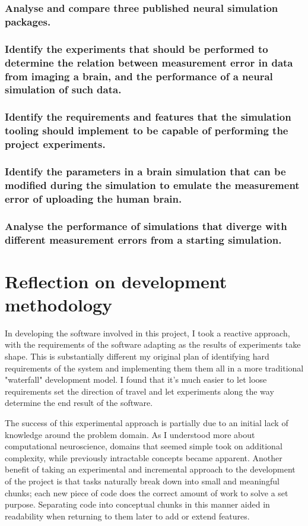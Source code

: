\subsubsection{Analyse and compare three published neural simulation packages.}

\subsubsection{Identify the experiments that should be performed to determine
      the relation between measurement error in data from imaging a brain, and
      the performance of a neural simulation of such data.}
      
\subsubsection{Identify the requirements and features that the simulation
      tooling should implement to be capable of performing the project
      experiments.}

\subsubsection{Identify the parameters in a brain simulation that can be
      modified during the simulation to emulate the measurement error of
      uploading the human brain.}

\subsubsection{Analyse the performance of simulations that diverge with
      different measurement errors from a starting simulation.}


\section{Reflection on development methodology}

In developing the software involved in this project, I took a reactive approach,
with the requirements of the software adapting as the results of experiments
take shape. This is substantially different my original plan of identifying hard
requirements of the system and implementing them them all in a more traditional
"waterfall" development model. I found that it's much easier to let loose requirements set the direction of travel and
let experiments along the way determine the end result of the software.

The success of this experimental approach is partially due to an initial lack of
knowledge around the problem domain. As I understood more about computational
neuroscience, domains that seemed simple took on additional complexity, while
previously intractable concepts became apparent. Another benefit of taking an experimental and incremental approach to the
development of the project is that tasks naturally break down into small and
meaningful chunks; each new piece of code does the correct amount of work to
solve a set purpose. Separating code into conceptual chunks in this manner aided
in readability when returning to them later to add or extend features.

